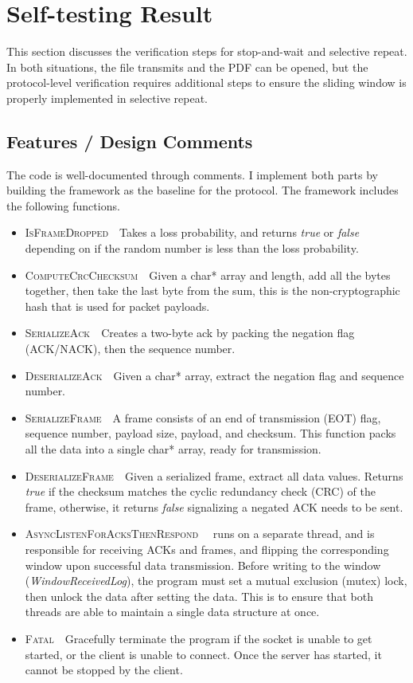 \documentclass[runningheads]{llncs}
\begin{document}
\section{Self-testing Result}

This section discusses the verification steps for stop-and-wait and selective repeat. In both situations, the file transmits and the PDF can be opened, but the protocol-level verification requires additional steps to ensure the sliding window is properly implemented in selective repeat.
\subsection{Features / Design Comments}
The code is well-documented through comments. I implement both parts by building the framework as the baseline for the protocol. The framework includes the following functions.
\begin{itemize}
    \item \textsc{IsFrameDropped}~\textemdash~Takes a loss probability, and returns \emph{true} or \emph{false} depending on if the random number is less than the loss probability.
    \item \textsc{ComputeCrcChecksum}~\textemdash~Given a char* array and length, add all the bytes together, then take the last byte from the sum, this is the non-cryptographic hash that is used for packet payloads.
    \item \textsc{SerializeAck}~\textemdash~Creates a two-byte ack by packing the negation flag (ACK/NACK), then the sequence number.
    \item \textsc{DeserializeAck}~\textemdash~Given a char* array, extract the negation flag and sequence number.
    \item \textsc{SerializeFrame}~\textemdash~A frame consists of an end of transmission (EOT) flag, sequence number, payload size, payload, and checksum. This function packs all the data into a single char* array, ready for transmission.
    \item \textsc{DeserializeFrame}~\textemdash~Given a serialized frame, extract all data values. Returns \emph{true} if the checksum matches the cyclic redundancy check (CRC) of the frame, otherwise, it returns \emph{false} signalizing a negated ACK needs to be sent.
    \item \textsc{AsyncListenForAcksThenRespond}~\textemdash~ runs on a separate thread, and is responsible for receiving ACKs and frames, and flipping the corresponding window upon successful data transmission. Before writing to the window (\emph{WindowReceivedLog}), the program must set a mutual exclusion (mutex) lock, then unlock the data after setting the data. This is to ensure that both threads are able to maintain a single data structure at once.
    \item \textsc{Fatal}~\textemdash~Gracefully terminate the program if the socket is unable to get started, or the client is unable to connect. Once the server has started, it cannot be stopped by the client.
\end{itemize}
\end{document}

